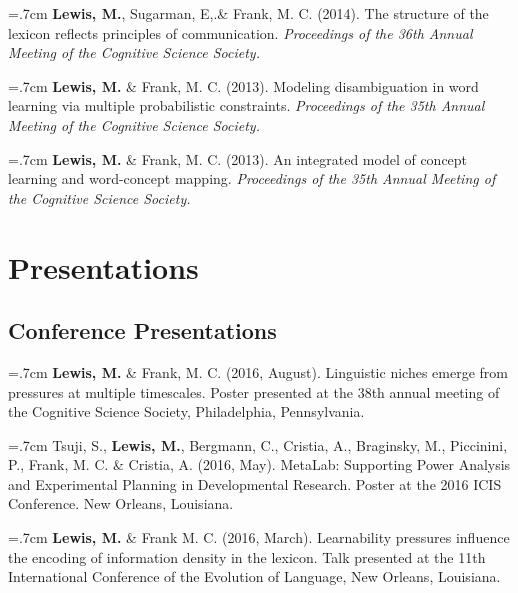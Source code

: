 \documentclass[letterpaper]{article}
\begin{document}
 \hangindent=.7cm {\bf Lewis, M.}, Sugarman, E,.\& Frank, M. C. (2014). The structure of the lexicon reflects principles of communication. { \it Proceedings of the 36th Annual Meeting of the Cognitive Science Society.}
  
  
 \hangindent=.7cm {\bf Lewis, M.} \& Frank, M. C. (2013). Modeling disambiguation in word learning via multiple probabilistic constraints. { \it Proceedings of the 35th Annual Meeting of the Cognitive Science Society.}

 \hangindent=.7cm {\bf Lewis, M.} \& Frank, M. C. (2013). An integrated model of concept learning and word-concept mapping.{ \it Proceedings of the 35th Annual Meeting of the Cognitive Science Society.}
 
 \singlespacing
 
\section*{Presentations}
\onehalfspacing

\subsection*{Conference Presentations}

\hangindent=.7cm {\bf Lewis, M.} \& Frank, M. C. (2016, August).  Linguistic niches emerge from pressures at multiple timescales. Poster presented at the 38th annual meeting of the Cognitive Science Society, Philadelphia, Pennsylvania.

 \hangindent=.7cm  Tsuji, S., {\bf Lewis, M.}, Bergmann, C., Cristia, A.,  Braginsky, M.,  Piccinini, P., Frank, M. C. \& Cristia, A. (2016, May). MetaLab: Supporting Power Analysis and Experimental Planning in Developmental Research. Poster at the 2016 ICIS Conference. New Orleans, Louisiana.


  \hangindent=.7cm {\bf Lewis, M.} \& Frank M. C. (2016, March). Learnability pressures influence the encoding of information density in the lexicon. Talk presented at the 11th International Conference of the Evolution of Language, New Orleans, Louisiana.
  
\end{document}
